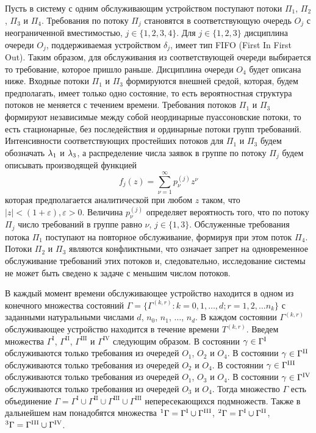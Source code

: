 \documentclass[a4paper,12pt,russian]{extarticle}
\newcommand{\G}{\Gamma}
\newcommand{\ga}[1]{\Gamma^{\left( #1 \right)} }
\newcommand{\Tt}[1]{T^{\left( #1 \right)} }
\begin{document}
Пусть в систему с одним обслуживающим устройством поступают потоки $\Pi_1$, $\Pi_2$, $\Pi_3$  и $\Pi_4$. Требования по потоку $\Pi_j$ становятся в соответствующую очередь $O_j$ с неограниченной вместимостью, $j\in \{1, 2, 3, 4\}$. Для $j \in \{1, 2, 3\}$ дисциплина очереди $O_j$, поддерживаемая устройством $\delta_j$, имеет тип FIFO (First In First Out). Таким образом, для обслуживания из соответствующей очереди выбирается то требование, которое пришло раньше. Дисциплина очереди $O_4$ будет описана ниже. Входные потоки $\Pi_1$ и $\Pi_3$ формируются внешней средой, которая, будем предполагать, имеет только одно состояние, то есть вероятностная структура потоков не меняется с течением времени. Требования потоков $\Pi_1$ и $\Pi_3$ формируют независимые между собой неординарные пуассоновские потоки, то есть  стационарные, без последействия и ординарные потоки групп требований. Интенсивности соответствующих простейших потоков для $\Pi_1$ и $\Pi_3$ будем обозначать $\lambda_1$ и $\lambda_3$, а распределение числа заявок в группе по потоку $\Pi_j$ будем описывать производящей функцией
\begin{equation}
f_j(z) = \sum_{\nu=1}^{\infty} p_{\nu}^{(j)} z ^{\nu}
\label{GeneratingFunc}
\end{equation}
которая предполагается аналитической при любом $z$ таком, что $|z|<(1+\varepsilon), \varepsilon > 0$. Величина $p_{\nu}^{(j)}$ определяет вероятность того, что по потоку $\Pi_j$ число требований в группе равно $\nu$, $j\in \{1,3\}$. Обслуженные требования потока $\Pi_1$ поступают на повторное обслуживание, формируя при этом поток $\Pi_4$. Потоки $\Pi_2$ и $\Pi_3$ являются конфликтными, что означает запрет на одновременное обслуживание требований этих потоков и, следовательно, исследование системы не может быть сведено к задаче с меньшим числом потоков. 
 
 В каждый момент времени обслуживающее устройство находится в одном из конечного множества состояний $\Gamma=\{\G^{(k,r)} \colon k=0,1,\ldots,d; r=1,2,\ldots n_k\}$ с заданными натуральными числами $d$, $n_0$, $n_1$, $\ldots$, $n_d$. В каждом состоянии $\ga{k,r}$ обслуживающее устройство находится в течение времени $\Tt{k,r}$. Введем множества $\G^{\mathrm{I}}$, $\G^{\mathrm{II}}$, $\G^{\mathrm{III}}$ и $\G^{\mathrm{IV}}$ следующим образом. В состоянии $\gamma \in \G^{\mathrm{\Rmnum{1}}}$ обслуживаются только требования из очередей $O_1$, $O_2$ и $O_4$.
В состоянии $\gamma \in \G^{\mathrm{\Rmnum{2}}}$ обслуживаются только требования из очередей $O_2$ и $O_4$.
В состоянии $\gamma \in \G^{\mathrm{\Rmnum{3}}}$ обслуживаются только требования из очередей $O_1$, $O_3$ и $O_4$.
В состоянии $\gamma \in \G^{\mathrm{\Rmnum{4}}}$ обслуживаются только требования из очередей $O_3$ и $O_4$.
Тогда множество $\G$ есть объединение $\G = \G^{\mathrm{I}} \cup \G^{\mathrm{II}} \cup \G^{\mathrm{III}} \cup \G^{\mathrm{III}}$ непересекающихся подмножеств. Также в дальнейшем нам понадобятся множества ${}^1\G=\G^{\mathrm{\Rmnum{1}}} \cup \G^{\mathrm{\Rmnum{3}}}$, 
${}^2\G=\G^{\mathrm{\Rmnum{1}}} \cup \G^{\mathrm{\Rmnum{2}}}$,
${}^3\G=\G^{\mathrm{\Rmnum{3}}} \cup \G^{\mathrm{\Rmnum{4}}}$. 
\end{document}

